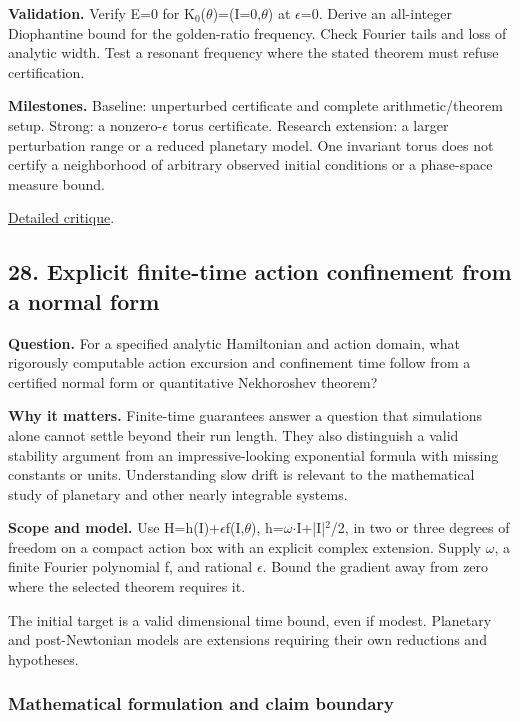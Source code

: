 \documentclass[
  11pt,
]{article}
\begin{document}
\textbf{Validation.} Verify E=0 for
K\ensuremath{{}_{0}}(\ensuremath{\theta})=(I=0,\ensuremath{\theta}) at
\ensuremath{\epsilon}=0. Derive an all-integer Diophantine bound for the
golden-ratio frequency. Check Fourier tails and loss of analytic width.
Test a resonant frequency where the stated theorem must refuse
certification.

\textbf{Milestones.} Baseline: unperturbed certificate and complete
arithmetic/theorem setup. Strong: a nonzero-\ensuremath{\epsilon} torus
certificate. Research extension: a larger perturbation range or a
reduced planetary model. One invariant torus does not certify a
neighborhood of arbitrary observed initial conditions or a phase-space
measure bound.

\href{https://github.com/rick-stevens-ai/Pure-Thought/blob/main/reviews/26-KAM-Theory-Planetary-Stability.md}{Detailed
critique}.

\subsection{28. Explicit finite-time action confinement from a normal
form}

\textbf{Question.} For a specified analytic Hamiltonian and action
domain, what rigorously computable action excursion and confinement time
follow from a certified normal form or quantitative Nekhoroshev theorem?

\textbf{Why it matters.} Finite-time guarantees answer a question that
simulations alone cannot settle beyond their run length. They also
distinguish a valid stability argument from an impressive-looking
exponential formula with missing constants or units. Understanding slow
drift is relevant to the mathematical study of planetary and other
nearly integrable systems.

\textbf{Scope and model.} Use
H=h(I)+\ensuremath{\epsilon}f(I,\ensuremath{\theta}),
h=\ensuremath{\omega}\ensuremath{\cdot}I+|I|\ensuremath{{}^{2}}/2, in
two or three degrees of freedom on a compact action box with an explicit
complex extension. Supply \ensuremath{\omega}, a finite Fourier
polynomial f, and rational \ensuremath{\epsilon}. Bound the gradient
away from zero where the selected theorem requires it.

The initial target is a valid dimensional time bound, even if modest.
Planetary and post-Newtonian models are extensions requiring their own
reductions and hypotheses.

\subsubsection{Mathematical formulation and claim boundary}
\end{document}
